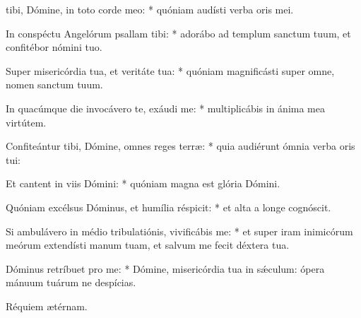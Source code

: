\begin{psalmus}

 tibi, Dómine, in toto corde meo: * quóniam audísti verba oris mei.

In conspéctu Angelórum psallam tibi: * adorábo ad templum sanctum tuum, et confitébor nómini tuo.

Super misericórdia tua, et veritáte tua: * quóniam magnificásti super omne, nomen sanctum tuum.

In quacúmque die invocávero te, exáudi me: * multiplicábis in ánima mea virtútem.

Confiteántur tibi, Dómine, omnes reges terræ: * quia audiérunt ómnia verba oris tui:

Et cantent in viis Dómini: * quóniam magna est glória Dómini.

Quóniam excélsus Dóminus, et humília réspicit: * et alta a longe cognóscit.

Si ambulávero in médio tribulatiónis, vivificábis me: * et super iram inimicórum meórum extendísti manum tuam, et salvum me fecit déxtera tua.

Dóminus retríbuet pro me: * Dómine, misericórdia tua in sǽculum: ópera mánuum tuárum ne despícias.

Réquiem ætérnam.

\end{psalmus}
